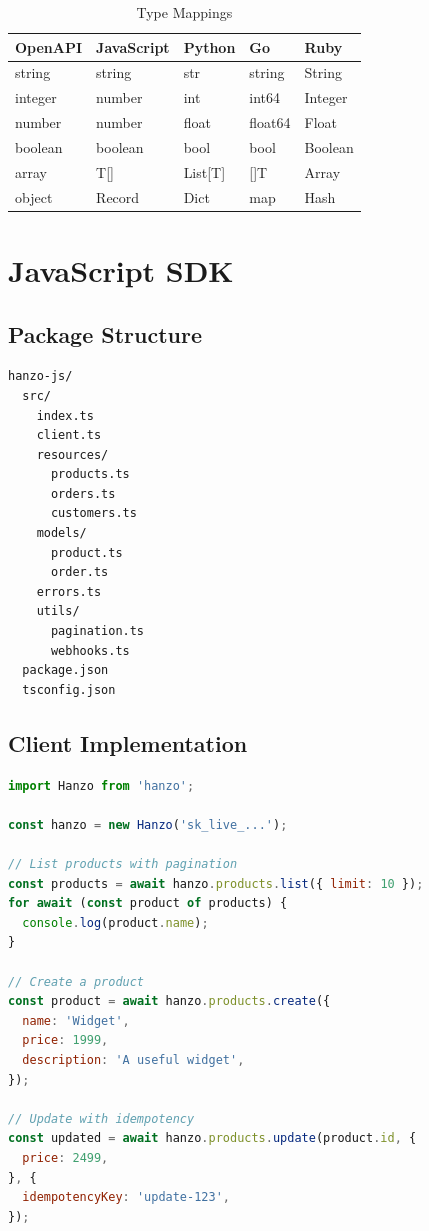 \documentclass[11pt,a4paper]{article}
\begin{document}
\begin{table}[h]
\centering
\caption{Type Mappings}
\begin{tabular}{lllll}
\toprule
\textbf{OpenAPI} & \textbf{JavaScript} & \textbf{Python} & \textbf{Go} & \textbf{Ruby} \\
\midrule
string & string & str & string & String \\
integer & number & int & int64 & Integer \\
number & number & float & float64 & Float \\
boolean & boolean & bool & bool & Boolean \\
array & T[] & List[T] & []T & Array \\
object & Record & Dict & map & Hash \\
\bottomrule
\end{tabular}
\end{table}

\section{JavaScript SDK}

\subsection{Package Structure}

\begin{lstlisting}[caption=JavaScript SDK Structure]
hanzo-js/
  src/
    index.ts
    client.ts
    resources/
      products.ts
      orders.ts
      customers.ts
    models/
      product.ts
      order.ts
    errors.ts
    utils/
      pagination.ts
      webhooks.ts
  package.json
  tsconfig.json
\end{lstlisting}

\subsection{Client Implementation}

\begin{lstlisting}[language=JavaScript, caption=JavaScript Client]
import Hanzo from 'hanzo';

const hanzo = new Hanzo('sk_live_...');

// List products with pagination
const products = await hanzo.products.list({ limit: 10 });
for await (const product of products) {
  console.log(product.name);
}

// Create a product
const product = await hanzo.products.create({
  name: 'Widget',
  price: 1999,
  description: 'A useful widget',
});

// Update with idempotency
const updated = await hanzo.products.update(product.id, {
  price: 2499,
}, {
  idempotencyKey: 'update-123',
});
\end{lstlisting}
\end{document}
